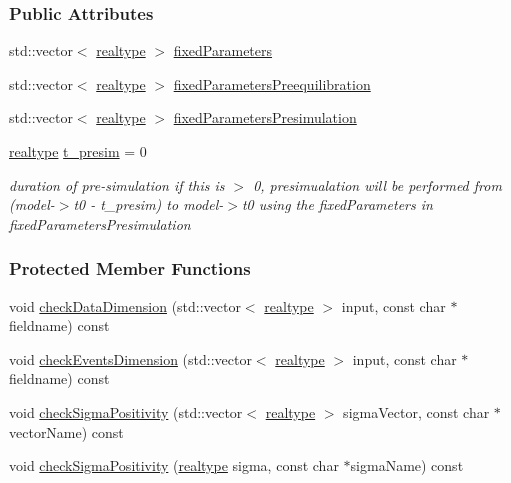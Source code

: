 \subsubsection*{Public Attributes}
\begin{DoxyCompactItemize}
\item 
std\+::vector$<$ \mbox{\hyperlink{namespaceamici_a1bdce28051d6a53868f7ccbf5f2c14a3}{realtype}} $>$ \mbox{\hyperlink{classamici_1_1_exp_data_ac1d5115134ec1c839f1e913724ceb2b4}{fixed\+Parameters}}
\item 
std\+::vector$<$ \mbox{\hyperlink{namespaceamici_a1bdce28051d6a53868f7ccbf5f2c14a3}{realtype}} $>$ \mbox{\hyperlink{classamici_1_1_exp_data_acee836e015941b3984c44e1c7423b101}{fixed\+Parameters\+Preequilibration}}
\item 
std\+::vector$<$ \mbox{\hyperlink{namespaceamici_a1bdce28051d6a53868f7ccbf5f2c14a3}{realtype}} $>$ \mbox{\hyperlink{classamici_1_1_exp_data_a86fb66aedc21085f868fb6509a45c92d}{fixed\+Parameters\+Presimulation}}
\item 
\mbox{\label{classamici_1_1_exp_data_acb5fa397f91ea45e9e2890036d339969}} 
\mbox{\hyperlink{namespaceamici_a1bdce28051d6a53868f7ccbf5f2c14a3}{realtype}} \mbox{\hyperlink{classamici_1_1_exp_data_acb5fa397f91ea45e9e2890036d339969}{t\+\_\+presim}} = 0
\begin{DoxyCompactList}\small\item\em duration of pre-\/simulation if this is $>$ 0, presimualation will be performed from (model-\/$>$t0 -\/ t\+\_\+presim) to model-\/$>$t0 using the fixed\+Parameters in fixed\+Parameters\+Presimulation \end{DoxyCompactList}\end{DoxyCompactItemize}
\subsubsection*{Protected Member Functions}
\begin{DoxyCompactItemize}
\item 
void \mbox{\hyperlink{classamici_1_1_exp_data_acad115e928a8b0bc8e90ebf9553d3eed}{check\+Data\+Dimension}} (std\+::vector$<$ \mbox{\hyperlink{namespaceamici_a1bdce28051d6a53868f7ccbf5f2c14a3}{realtype}} $>$ input, const char $\ast$fieldname) const
\item 
void \mbox{\hyperlink{classamici_1_1_exp_data_adcf5587f972fdef595fff78123f5118a}{check\+Events\+Dimension}} (std\+::vector$<$ \mbox{\hyperlink{namespaceamici_a1bdce28051d6a53868f7ccbf5f2c14a3}{realtype}} $>$ input, const char $\ast$fieldname) const
\item 
void \mbox{\hyperlink{classamici_1_1_exp_data_a30d756faaf9ea395446fbc5c65a7b125}{check\+Sigma\+Positivity}} (std\+::vector$<$ \mbox{\hyperlink{namespaceamici_a1bdce28051d6a53868f7ccbf5f2c14a3}{realtype}} $>$ sigma\+Vector, const char $\ast$vector\+Name) const
\item 
void \mbox{\hyperlink{classamici_1_1_exp_data_a0ed66c4deb1937ad309e8c52a452d9eb}{check\+Sigma\+Positivity}} (\mbox{\hyperlink{namespaceamici_a1bdce28051d6a53868f7ccbf5f2c14a3}{realtype}} sigma, const char $\ast$sigma\+Name) const
\end{DoxyCompactItemize}
